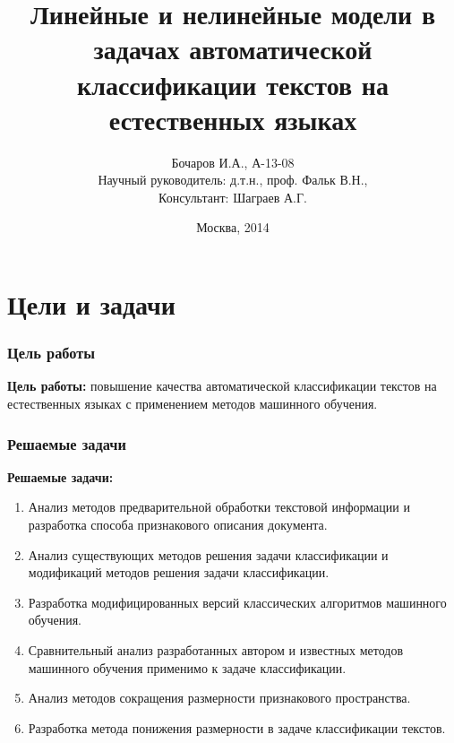 \documentclass{beamer}
\begin{document}
\title[Линейные и нелинейные модели]{Линейные и нелинейные модели в задачах автоматической классификации текстов на естественных языках}  
\author[Бочаров И.А.]{Бочаров И.А., А-13-08 \\Научный руководитель: д.т.н., проф. Фальк В.Н.,\\Консультант: Шаграев А.Г.}

\date{Москва, 2014} 
\begin{frame}[plain]
	\titlepage
\end{frame}
\begin{frame}
	\tableofcontents
\end{frame}

\section{Цели и задачи}
\begin{frame}
\frametitle{Цель работы}
\textbf{Цель работы:} повышение качества автоматической классификации текстов на естественных языках с применением методов машинного обучения.\\
\end{frame}

\begin{frame}
\frametitle{Решаемые задачи}

\textbf{Решаемые задачи:}
\begin{enumerate}
	\item{Анализ методов предварительной обработки текстовой информации и разработка способа признакового описания документа.}
	\item{Анализ существующих методов решения задачи классификации и модификаций методов решения задачи классификации.}
	\item{Разработка модифицированных версий классических алгоритмов машинного обучения.}
	\item{Сравнительный анализ разработанных автором и известных методов машинного обучения применимо к задаче классификации.}
	\item{Анализ методов сокращения размерности признакового пространства.}
	\item{Разработка метода понижения размерности в задаче классификации текстов.}
\end{enumerate}
\end{frame}
\end{document}
